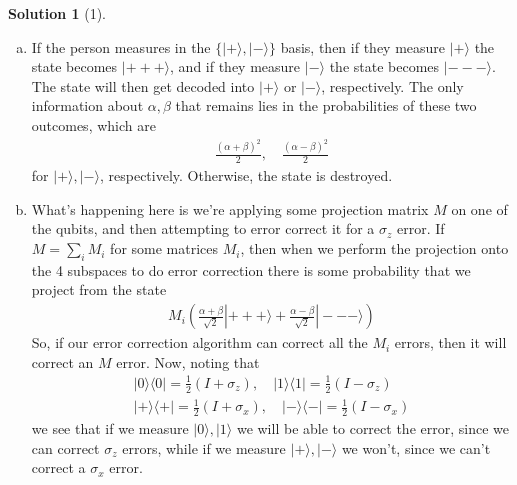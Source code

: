 \documentclass[11pt]{article}
\theoremstyle{definition}
\newtheorem*{solution}{Solution}
\newcommand{\eq}{\begin{equation}\begin{aligned}}
\newcommand{\qe}{\end{aligned}\end{equation}}
\newcommand{\bra}[1]{\langle #1|}
\newcommand{\ket}[1]{|#1\rangle}
\begin{document}
\begin{solution}[1]
\begin{enumerate}[(a)]
    \item If the person measures in the $\{\ket{+},\ket{-}\}$ basis, then if they measure $\ket{+}$ the state becomes $\ket{+++}$, and if they measure $\ket{-}$ the state becomes $\ket{---}$. The state will then get decoded into $\ket{+}$ or $\ket{-}$, respectively. The only information about $\alpha,\beta$ that remains lies in the probabilities of these two outcomes, which are
    \eq
      \frac{(\alpha+\beta)^2}{2},\quad \frac{(\alpha-\beta)^2}{2}
    \qe
    for $\ket{+},\ket{-}$, respectively. Otherwise, the state is destroyed.
    \item What's happening here is we're applying some projection matrix $M$ on one of the qubits, and then attempting to error correct it for a $\sigma_z$ error. If $M=\sum_{i}M_i$ for some matrices $M_i$, then when we perform the projection onto the 4 subspaces to do error correction there is some probability that we project from the state 
   \eq
    M_i\left(\frac{\alpha+\beta}{\sqrt{2}}\ket{+++}+\frac{\alpha-\beta}{\sqrt{2}}\ket{---}\right)
  \qe
  So, if our error correction algorithm can correct all the $M_i$ errors, then it will correct an $M$ error. Now, noting that
    \eq
      \ket{0}\bra{0}=\frac{1}{2}(I+\sigma_z),\quad
      \ket{1}\bra{1}=\frac{1}{2}(I-\sigma_z)\\
      \ket{+}\bra{+}=\frac{1}{2}(I+\sigma_x),\quad
      \ket{-}\bra{-}=\frac{1}{2}(I-\sigma_x)
    \qe
    we see that if we measure $\ket{0},\ket{1}$ we will be able to correct the error, since we can correct $\sigma_z$ errors, while if we measure $\ket{+},\ket{-}$ we won't, since we can't correct a $\sigma_x$ error.
  \end{enumerate}
\end{solution}
\end{document}
